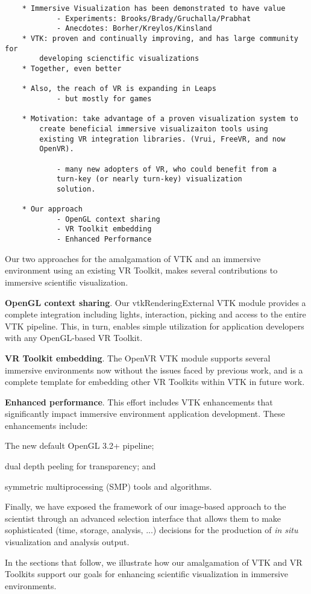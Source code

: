 
\begin{verbatim}
	* Immersive Visualization has been demonstrated to have value
		    - Experiments: Brooks/Brady/Gruchalla/Prabhat
		    - Anecdotes: Borher/Kreylos/Kinsland
	* VTK: proven and continually improving, and has large community for
		developing scienctific visualizations
	* Together, even better

	* Also, the reach of VR is expanding in Leaps
		    - but mostly for games

	* Motivation: take advantage of a proven visualization system to
		create beneficial immersive visualizaiton tools using
		existing VR integration libraries. (Vrui, FreeVR, and now
		OpenVR).

		    - many new adopters of VR, who could benefit from a
			turn-key (or nearly turn-key) visualization
			solution.

	* Our approach
		    - OpenGL context sharing
		    - VR Toolkit embedding
		    - Enhanced Performance

\end{verbatim}


Our two approaches for the amalgamation of VTK and an immersive environment using an existing VR Toolkit, makes several contributions to immersive scientific visualization.

\textbf{OpenGL context sharing}. Our vtkRenderingExternal VTK module provides a complete integration including lights, interaction, picking and access to the entire VTK pipeline. This, in turn, enables simple utilization for application developers with any OpenGL-based VR Toolkit.

\textbf{VR Toolkit embedding}. The OpenVR VTK module supports several immersive environments now without the issues faced by previous work, and is a complete template for embedding other VR Toolkits within VTK in future work.

\textbf{Enhanced performance}. This effort includes VTK enhancements that significantly impact immersive environment application development. These enhancements include:

\begin{compactitem}
\item The new default OpenGL 3.2+ pipeline;
\item dual depth peeling for transparency; and 
\item symmetric multiprocessing (SMP) tools and algorithms.
\end{compactitem}

Finally, we have exposed the framework of our image-based approach to the scientist through an advanced selection interface that allows them to make sophisticated (time, storage, analysis, ...) decisions for the production of \textit{in situ} visualization and analysis output.

In the sections that follow, we illustrate how our amalgamation of VTK and VR Toolkits support our goals for enhancing scientific visualization in immersive environments.
